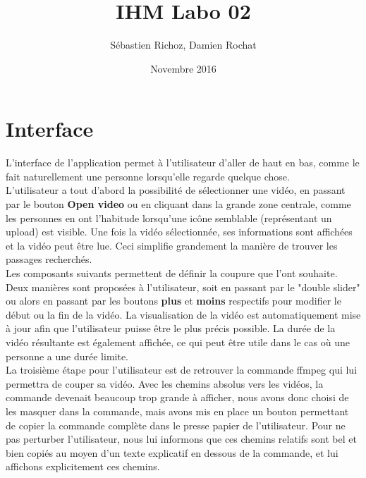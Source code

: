 \documentclass[11pt, a4paper, french]{article}
\title{IHM Labo 02}
\author{Sébastien Richoz, Damien Rochat}
\date{Novembre 2016}
\begin{document}
	\maketitle

	\part*{Interface}
		 L'interface de l'application permet à l'utilisateur d'aller de haut en bas, comme le fait naturellement une personne lorsqu'elle regarde quelque chose. \\
		 
		 L'utilisateur a tout d'abord la possibilité de sélectionner une vidéo, en passant par le bouton \textbf{Open video} ou en cliquant dans la grande zone centrale, comme les personnes en ont l'habitude lorsqu'une icône semblable (représentant un upload) est visible. Une fois la vidéo sélectionnée, ses informations sont affichées et la vidéo peut être lue. Ceci simplifie grandement la manière de trouver les passages recherchés. \\
		 
		 Les composants suivants permettent de définir la coupure que l'ont souhaite. Deux manières sont proposées à l'utilisateur, soit en passant par le "double slider" ou alors en passant par les boutons \textbf{plus} et \textbf{moins} respectifs pour modifier le début ou la fin de la vidéo. La visualisation de la vidéo est automatiquement mise à jour afin que l'utilisateur puisse être le plus précis possible. La durée de la vidéo résultante est également affichée, ce qui peut être utile dans le cas où une personne a une durée limite. \\
		 
		 La troisième étape pour l'utilisateur est de retrouver la commande ffmpeg qui lui permettra de couper sa vidéo. Avec les chemins absolus vers les vidéos, la commande devenait beaucoup trop grande à afficher, nous avons donc choisi de les masquer dans la commande, mais avons mis en place un bouton permettant de copier la commande complète dans le presse papier de l'utilisateur. Pour ne pas perturber l'utilisateur, nous lui informons que ces chemins relatifs sont bel et bien copiés au moyen d'un texte explicatif en dessous de la commande, et lui affichons explicitement ces chemins.
		 
\end{document}
